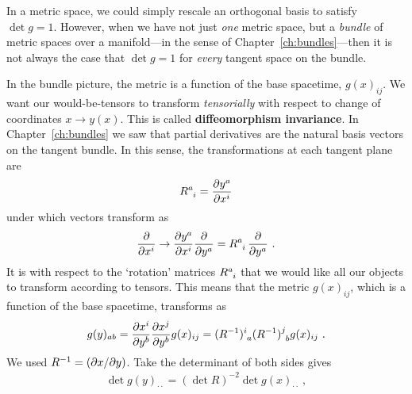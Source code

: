 \begin{subappendices}
 
In a metric space, we could simply rescale an orthogonal basis to satisfy $\det g =1$. However, when we have not just \emph{one} metric space, but a \emph{bundle} of metric spaces over a manifold---in the sense of Chapter~\ref{ch:bundles}---then it is not always the case that $\det g =1$ for \emph{every} tangent space on the bundle.
% 

In the bundle picture, the metric is a function of the base spacetime, $g(x)_{ij}$. 
% 
% 
We want our would-be-tensors to transform \emph{tensorially} with respect to change of coordinates $x \to  y(x)$. This is called \textbf{diffeomorphism invariance}.  In Chapter~\ref{ch:bundles} we saw that partial derivatives are the natural basis vectors on the tangent bundle. In this sense, the transformations at each tangent plane are
\begin{align}
    R\aij{a}{i} = \frac{\partial y^a}{\partial x^i}
\end{align}
under which vectors transform as
\begin{align}
    \frac{\partial}{\partial x^i} \to 
    \frac{\partial y^a}{\partial x^i} \frac{\partial}{\partial y^a}
    = R\aij{a}{i} \, \frac{\partial}{\partial y^a} \ .
\end{align}
It is with respect to the `rotation' matrices $R\aij{a}{i}$ that we would like all our objects to transform according to tensors. 
% 
This means that the metric $g(x)_{ij}$, which is a function of the base spacetime, transforms as
\begin{align}
    g(y)_{ab} = \frac{\partial x^i}{\partial y^b}  \frac{\partial x^j}{\partial y^b} g(x)_{ij}
    = (R\inv)\aij{i}{a} (R\inv)\aij{j}{b} g(x)_{ij} \ .
\end{align}
We used $R^{-1} = (\partial x/\partial y)$. Take the determinant of both sides gives
\begin{align}
    \det g(y)_{\cdot\cdot} = (\det R)^{-2} \det g(x)_{\cdot\cdot} \ ,
    \label{eq:transformation:of:det:g}
\end{align}

\end{subappendices}
